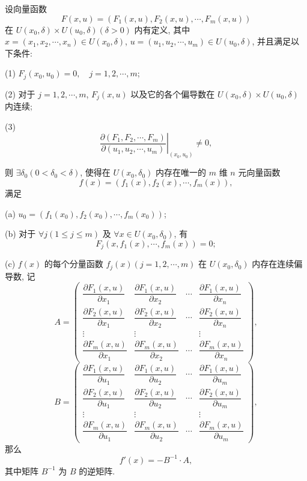 \begin{theorem}[{隐函数组存在定理}]\label{theorem:ma-14-4-3}
设向量函数
\[
  F(x,u)=(F_1(x,u),F_2(x,u),\cdots,F_m(x,u))
\]
在 $U(x_0,\delta)\times U(u_0,\delta)(\delta>0)$ 内有定义, 其中 $x=(x_1,x_2,\cdots,x_n)\in U(x_0,\delta)$, $u=(u_1,u_2,\cdots,u_m)\in U(u_0,\delta)$, 并且满足以下条件:

(1) $F_j(x_0,u_0)=0,\quad j=1,2,\cdots,m$;

(2) 对于 $j=1,2,\cdots,m$, $F_j(x,u)$ 以及它的各个偏导数在 $U(x_0,\delta)\times U(u_0,\delta)$ 内连续;

(3)
\[
  \left.
  \frac{\partial(F_1,F_2,\cdots,F_m)}
  {\partial(u_1,u_2,\cdots,u_m)}
  \right|_{(x_0,u_0)}
  \ne0,
\]

则 $\exists\delta_0(0<\delta_0<\delta)$, 使得在 $U(x_0,\delta_0)$ 内存在唯一的 $m$ 维 $n$ 元向量函数
\[
  f(x)=(f_1(x),f_2(x),\cdots,f_m(x)),
\]
满足

(a) $u_0=(f_1(x_0),f_2(x_0),\cdots,f_m(x_0))$;

(b) 对于 $\forall j(1\leqslant j\leqslant m)$ 及 $\forall x\in U(x_0,\delta_0)$, 有
\[
  F_j(x,f_1(x),\cdots,f_m(x))=0;
\]

(c) $f(x)$ 的每个分量函数 $f_j(x)(j=1,2,\cdots,m)$ 在 $U(x_0,\delta_0)$ 内存在连续偏导数, 记
\[
  A=
  \begin{pmatrix}
    \dfrac{\partial F_1(x,u)}{\partial x_1} &
    \dfrac{\partial F_1(x,u)}{\partial x_2} &
    \cdots &
    \dfrac{\partial F_1(x,u)}{\partial x_n}\\
    \dfrac{\partial F_2(x,u)}{\partial x_1} &
    \dfrac{\partial F_2(x,u)}{\partial x_2} &
    \cdots &
    \dfrac{\partial F_2(x,u)}{\partial x_n}\\
    \vdots & \vdots & & \vdots\\
    \dfrac{\partial F_m(x,u)}{\partial x_1} &
    \dfrac{\partial F_m(x,u)}{\partial x_2} &
    \cdots &
    \dfrac{\partial F_m(x,u)}{\partial x_n}
  \end{pmatrix},
\]
\[
  B=
  \begin{pmatrix}
    \dfrac{\partial F_1(x,u)}{\partial u_1} &
    \dfrac{\partial F_1(x,u)}{\partial u_2} &
    \cdots &
    \dfrac{\partial F_1(x,u)}{\partial u_m}\\
    \dfrac{\partial F_2(x,u)}{\partial u_1} &
    \dfrac{\partial F_2(x,u)}{\partial u_2} &
    \cdots &
    \dfrac{\partial F_2(x,u)}{\partial u_m}\\
    \vdots & \vdots & & \vdots\\
    \dfrac{\partial F_m(x,u)}{\partial u_1} &
    \dfrac{\partial F_m(x,u)}{\partial u_2} &
    \cdots &
    \dfrac{\partial F_m(x,u)}{\partial u_m}
  \end{pmatrix},
\]
那么
\[
  f'(x)=-B^{-1}\cdot A,
\]
其中矩阵 $B^{-1}$ 为 $B$ 的逆矩阵.
\end{theorem}


